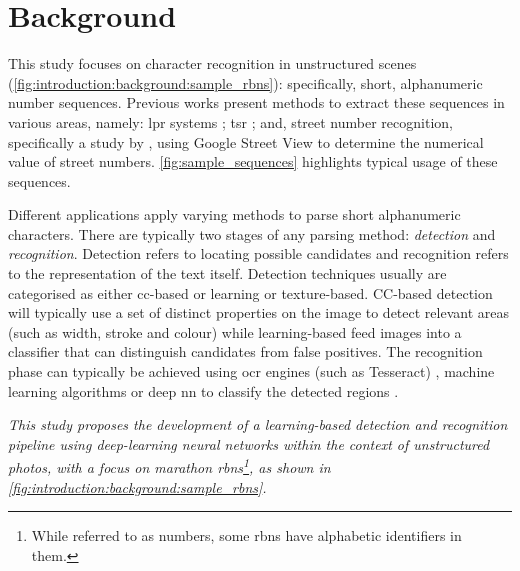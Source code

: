 \section{Background}
\label{sec:introduction:background}

This study focuses on character recognition in unstructured scenes (\cref{fig:introduction:background:sample_rbns}): specifically, short, alphanumeric number sequences. Previous works present methods to extract these sequences in various areas, namely: \gls{lpr} systems \citep{CanoPerez:2003fq,Anagnostopoulos:2006wv}; \gls{tsr} \citep{Eichner:2008dw,Kundu:2015vq,Seo:2015ez, Lian:2016dc}; and, street number recognition, specifically a study by \citet{Netzer:2011to}, using Google Street View to determine the numerical value of street numbers. \cref{fig:sample_sequences} highlights typical usage of these sequences.

Different applications apply varying methods to parse short alphanumeric characters. There are typically two stages of any parsing method: \textit{detection} and \textit{recognition}. Detection refers to locating possible candidates and recognition refers to the representation of the text itself. Detection techniques usually are categorised as either \gls{cc}-based or learning or texture-based. CC-based detection will typically use a set of distinct properties on the image to detect relevant areas (such as width, stroke and colour) while learning-based feed images into a classifier that can distinguish candidates from false positives. The recognition phase can typically be achieved using \gls{ocr} engines (such as Tesseract) \citep{Benami:2012jf}, machine learning algorithms \citep{Kundu:2015vq, Netzer:2011to, Lee:1994jz} or deep \gls{nn} to classify the detected regions \citep{Sermanet:2011ui, Lian:2016dc, Jin:2014jn}.

{
  \itshape
  This study proposes the development of a learning-based detection and recognition pipeline using deep-learning neural networks within the context of unstructured photos, with a focus on marathon \glspl{rbn}\footnote{While referred to as numbers, some \glspl{rbn} have alphabetic identifiers in them.}, as shown in \cref{fig:introduction:background:sample_rbns}.
}

